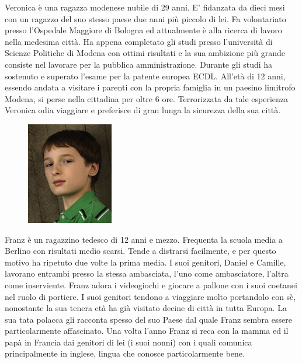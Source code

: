 \documentclass[12pt,a4paper,openright, notitlepage]{report}
\begin{document}
Veronica è una ragazza modenese nubile di 29 anni. E’ fidanzata da dieci mesi con un ragazzo del suo stesso paese due anni più piccolo di lei. Fa volontariato presso l’Ospedale Maggiore di Bologna ed attualmente è alla ricerca di lavoro nella medesima città. Ha appena completato gli studi presso l’università di Scienze Politiche di Modena con ottimi risultati e la sua ambizione più grande consiste nel lavorare per la pubblica amministrazione. Durante gli studi ha sostenuto e superato l’esame per la patente europea ECDL. All’età di 12 anni, essendo andata a visitare i parenti con la propria famiglia in un paesino limitrofo Modena, si perse nella cittadina per oltre 6 ore. Terrorizzata da tale esperienza Veronica odia viaggiare e preferisce di gran lunga la sicurezza della sua città.

\begin{figure}
  \vspace{-30pt}
  \begin{center}
    \includegraphics{imgs/franz.jpg}
  \end{center}
  \vspace{-30pt}
\end{figure}

Franz è un ragazzino tedesco di 12 anni e mezzo. Frequenta la scuola media a Berlino con risultati medio scarsi. Tende a distrarsi facilmente, e per questo motivo ha ripetuto due volte la prima media. I suoi genitori, Daniel e Camille, lavorano entrambi presso la stessa ambasciata, l’uno come ambasciatore, l’altra come inserviente. Franz adora i videogiochi e giocare a pallone con i suoi coetanei nel ruolo di portiere. I suoi genitori tendono a viaggiare molto portandolo con sè, nonostante la sua tenera età ha già visitato decine di città in tutta Europa. La sua tata polacca gli racconta spesso del suo Paese dal quale Franz sembra essere particolarmente affascinato. Una volta l’anno Franz si reca con la mamma ed il papà in Francia dai genitori di lei (i suoi nonni) con i quali comunica principalmente in inglese, lingua che conosce particolarmente bene.
\end{document}
